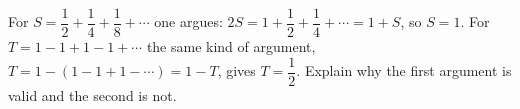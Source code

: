 For $S=\dfrac{1}{2}+\dfrac{1}{4}+\dfrac{1}{8}+\cdots$ one argues: $2S=1+\dfrac{1}{2}+\dfrac{1}{4}+\cdots=1+S$, so $S=1$. For $T=1-1+1-1+\cdots$ the same kind of argument, $T=1-(1-1+1-\cdots)=1-T$, gives $T=\dfrac{1}{2}$. Explain why the first argument is valid and the second is not.

